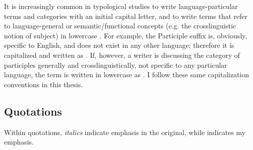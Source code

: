 It is increasingly common in typological studies to write language-particular terms and categories with an initial capital letter, and to write terms that refer to language-general or semantic/functional concepts (e.g. the crosslinguistic notion of subject) in lowercase \parencites[10]{Comrie1976}[47 (fn. 3), 141]{Bybee1985}[66]{Croft2000}[674]{Haspelmath2010a}[535]{Croft2014}. For example, the  Participle suffix  is, obviously, specific to English, and does not exist in any other language; therefore it is capitalized and written as . If, however, a writer is discussing the category of participles generally and crosslinguistically, not specific to any particular language, the term is written in lowercase as . I follow these same capitalization conventions in this thesis.

\subsection*{Quotations}

Within quotations, \emph{italics} indicate emphasis in the original, while  indicates my emphasis.
